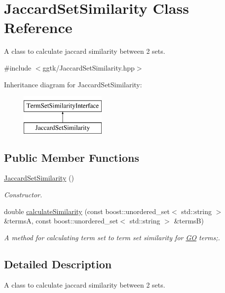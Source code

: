 \hypertarget{classJaccardSetSimilarity}{}\section{Jaccard\+Set\+Similarity Class Reference}
\label{classJaccardSetSimilarity}


A class to calculate jaccard similarity between 2 sets.  




{\ttfamily \#include $<$ggtk/\+Jaccard\+Set\+Similarity.\+hpp$>$}

Inheritance diagram for Jaccard\+Set\+Similarity\+:\begin{figure}[H]
\begin{center}
\leavevmode
\includegraphics[height=2.000000cm]{classJaccardSetSimilarity}
\end{center}
\end{figure}
\subsection*{Public Member Functions}
\begin{DoxyCompactItemize}
\item 
\hyperlink{classJaccardSetSimilarity_a91ae983223bd59f776c029c1c63f979d}{Jaccard\+Set\+Similarity} ()
\begin{DoxyCompactList}\small\item\em Constructor. \end{DoxyCompactList}\item 
double \hyperlink{classJaccardSetSimilarity_a122a04f7f67b96e393fcde1025a306c3}{calculate\+Similarity} (const boost\+::unordered\+\_\+set$<$ std\+::string $>$ \&termsA, const boost\+::unordered\+\_\+set$<$ std\+::string $>$ \&termsB)
\begin{DoxyCompactList}\small\item\em A method for calculating term set to term set similarity for \hyperlink{namespaceGO}{GO} terms;. \end{DoxyCompactList}\end{DoxyCompactItemize}


\subsection{Detailed Description}
A class to calculate jaccard similarity between 2 sets. 

